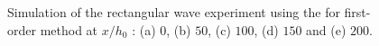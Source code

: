 \documentclass[SingleSpace,12pt,Proceedings]{Serre_ASCE}
\begin{document}
\begin{figure}
\caption{Simulation of the rectangular wave experiment using the for first-order method at $x/h_0$ : (a) $0$, (b) $50$, (c) $100$, (d) $150$ and (e) $200$.}
\label{fig:Seguro1}
\end{figure}
%
\end{document}
